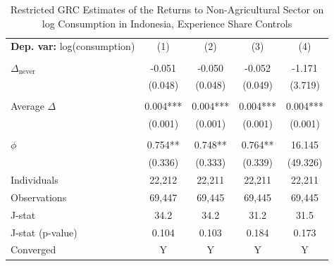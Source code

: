 \begin{table}[htbp] \centering \begin{threeparttable}
 \caption{Restricted GRC Estimates of the Returns to Non-Agricultural Sector on log Consumption in Indonesia, Experience Share Controls} 
 \label{tab:GRC_IDN_consumption_nonag_unb_exp_sh} 
\begin{tabular}{l cccc} \toprule  \textbf{Dep. var:}  log(consumption) 
                    &\multicolumn{1}{c}{(1)}   &\multicolumn{1}{c}{(2)}   &\multicolumn{1}{c}{(3)}   &\multicolumn{1}{c}{(4)}   \\
                    &               &               &               &               \\
\addlinespace
$\Delta_{\text{never}}$&      -0.051   &      -0.050   &      -0.052   &      -1.171   \\
                    &     (0.048)   &     (0.048)   &     (0.049)   &     (3.719)   \\
                    &               &               &               &               \\
\addlinespace
Average $\Delta$    &       0.004***&       0.004***&       0.004***&       0.004***\\
                    &     (0.001)   &     (0.001)   &     (0.001)   &     (0.001)   \\
                    &               &               &               &               \\
\addlinespace
$\phi$              &       0.754** &       0.748** &       0.764** &      16.145   \\
                    &     (0.336)   &     (0.333)   &     (0.339)   &    (49.326)   \\
\addlinespace
Individuals         &      22,212   &      22,211   &      22,211   &      22,211   \\
Observations        &      69,447   &      69,445   &      69,445   &      69,445   \\
J-stat              &        34.2   &        34.2   &        31.2   &        31.5   \\
J-stat (p-value)    &       0.104   &       0.103   &       0.184   &       0.173   \\
Converged           &           Y   &           Y   &           Y   &           Y   \\

\end{tabular}
\end{threeparttable}
\end{table}
